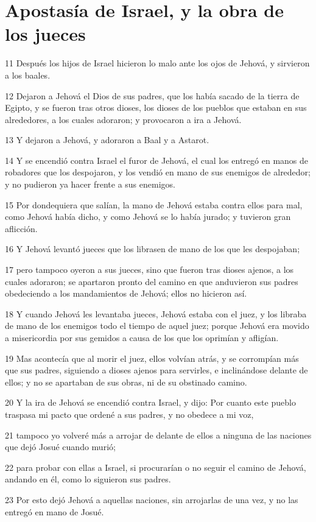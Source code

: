 \section*{Apostasía de Israel, y la obra de los jueces}

\par 11 Después los hijos de Israel hicieron lo malo ante los ojos de Jehová, y sirvieron a los baales.
\par 12 Dejaron a Jehová el Dios de sus padres, que los había sacado de la tierra de Egipto, y se fueron tras otros dioses, los dioses de los pueblos que estaban en sus alrededores, a los cuales adoraron; y provocaron a ira a Jehová.
\par 13 Y dejaron a Jehová, y adoraron a Baal y a Astarot.
\par 14 Y se encendió contra Israel el furor de Jehová, el cual los entregó en manos de robadores que los despojaron, y los vendió en mano de sus enemigos de alrededor; y no pudieron ya hacer frente a sus enemigos.
\par 15 Por dondequiera que salían, la mano de Jehová estaba contra ellos para mal, como Jehová había dicho, y como Jehová se lo había jurado; y tuvieron gran aflicción.
\par 16 Y Jehová levantó jueces que los librasen de mano de los que les despojaban;
\par 17 pero tampoco oyeron a sus jueces, sino que fueron tras dioses ajenos, a los cuales adoraron; se apartaron pronto del camino en que anduvieron sus padres obedeciendo a los mandamientos de Jehová; ellos no hicieron así.
\par 18 Y cuando Jehová les levantaba jueces, Jehová estaba con el juez, y los libraba de mano de los enemigos todo el tiempo de aquel juez; porque Jehová era movido a misericordia por sus gemidos a causa de los que los oprimían y afligían. 
\par 19 Mas acontecía que al morir el juez, ellos volvían atrás, y se corrompían más que sus padres, siguiendo a dioses ajenos para servirles, e inclinándose delante de ellos; y no se apartaban de sus obras, ni de su obstinado camino.
\par 20 Y la ira de Jehová se encendió contra Israel, y dijo: Por cuanto este pueblo traspasa mi pacto que ordené a sus padres, y no obedece a mi voz,
\par 21 tampoco yo volveré más a arrojar de delante de ellos a ninguna de las naciones que dejó Josué cuando murió;
\par 22 para probar con ellas a Israel, si procurarían o no seguir el camino de Jehová, andando en él, como lo siguieron sus padres.
\par 23 Por esto dejó Jehová a aquellas naciones, sin arrojarlas de una vez, y no las entregó en mano de Josué.

